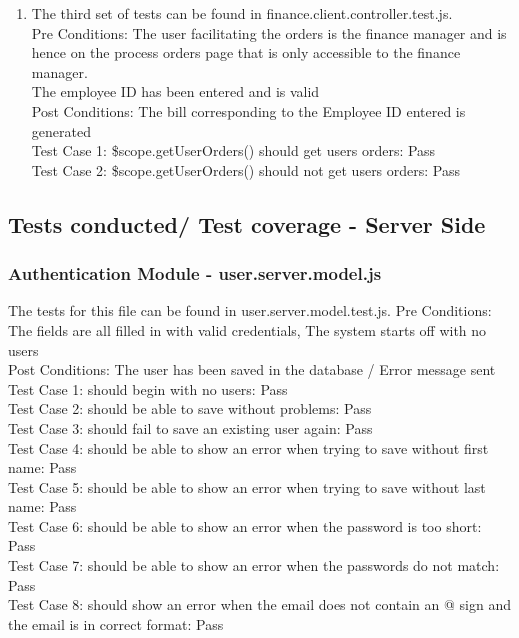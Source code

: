 \documentclass[a4paper,12pt]{article}
\begin{document}
\begin{enumerate}
\item The third set of tests can be found in finance.client.controller.test.js.\\
Pre Conditions: The user facilitating the orders is the finance manager and is hence on the process orders page that is only accessible to the finance manager. \\ The employee ID has been entered and is valid\\
Post Conditions: The bill corresponding to the Employee ID entered is generated\\
Test Case 1: \$scope.getUserOrders() should get users orders: Pass\\
Test Case 2: \$scope.getUserOrders() should not get users orders: Pass \\

\end{enumerate}

\subsection{Tests conducted/ Test coverage - Server Side}

\subsubsection{Authentication Module - user.server.model.js}
The tests for this file can be found in user.server.model.test.js.
Pre Conditions: The fields are all filled in with valid credentials, The system starts off with no users \\
Post Conditions: The user has been saved in the database /  Error message sent\\ 
Test Case 1: should begin with no users: Pass\\
Test Case 2: should be able to save without problems: Pass\\
Test Case 3: should fail to save an existing user again: Pass\\
Test Case 4: should be able to show an error when trying to save without first name: Pass\\
Test Case 5: should be able to show an error when trying to save without last name: Pass\\
Test Case 6: should be able to show an error when the password is too short: Pass\\
Test Case 7: should be able to show an error when the passwords do not match: Pass\\
Test Case 8: should show an error when the email does not contain an @ sign and the email is in correct format: Pass\\
\end{document}
